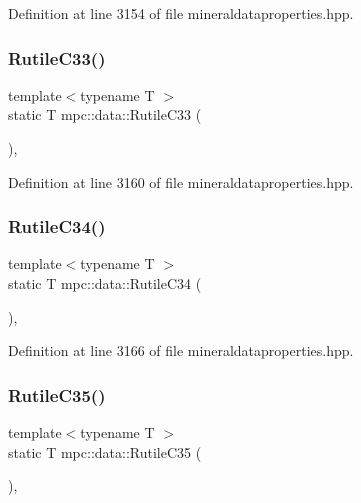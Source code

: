 Definition at line 3154 of file mineraldataproperties.\+hpp.

\mbox{\label{namespacempc_1_1data_ad16f8f99ef36895422dadeb665fba36c}} 
\subsubsection{\texorpdfstring{Rutile\+C33()}{RutileC33()}}
{\footnotesize\ttfamily template$<$typename T $>$ \\
static T mpc\+::data\+::\+Rutile\+C33 (\begin{DoxyParamCaption}{ }\end{DoxyParamCaption})\hspace{0.3cm}{\ttfamily [inline]}, {\ttfamily [static]}}



Definition at line 3160 of file mineraldataproperties.\+hpp.

\mbox{\label{namespacempc_1_1data_ab349fdb95b36e7172d9b818639f2a05b}} 
\subsubsection{\texorpdfstring{Rutile\+C34()}{RutileC34()}}
{\footnotesize\ttfamily template$<$typename T $>$ \\
static T mpc\+::data\+::\+Rutile\+C34 (\begin{DoxyParamCaption}{ }\end{DoxyParamCaption})\hspace{0.3cm}{\ttfamily [inline]}, {\ttfamily [static]}}



Definition at line 3166 of file mineraldataproperties.\+hpp.

\mbox{\label{namespacempc_1_1data_ae851e6cf72f83d8a81da78106739f08e}} 
\subsubsection{\texorpdfstring{Rutile\+C35()}{RutileC35()}}
{\footnotesize\ttfamily template$<$typename T $>$ \\
static T mpc\+::data\+::\+Rutile\+C35 (\begin{DoxyParamCaption}{ }\end{DoxyParamCaption})\hspace{0.3cm}{\ttfamily [inline]}, {\ttfamily [static]}}



